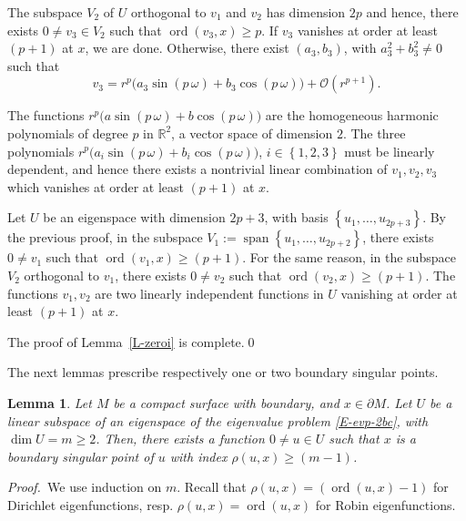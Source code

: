 \documentclass[12pt,a4paper]{amsart}
\theoremstyle{plain} %
\newtheorem{lemma}[theorem]{Lemma}
\theoremstyle{definition}
\numberwithin{equation}{section}
\numberwithin{figure}{section}
\numberwithin{table}{section}
\newcommand{\R}{\mathbb{R}}
\newcommand{\cO}{\mathcal{O}}
\DeclareMathOperator{\ord}{ord}
\DeclareMathOperator{\spanop}{span}
\newcommand{\pf}{\emph{Proof.~}}
\newcommand{\set}[1]{\left\lbrace #1 \right\rbrace}
\newcommand{\spanv}[1]{\spanop\!\left\lbrace #1 \right\rbrace}
\begin{document}
The subspace $V_2$ of $U$ orthogonal to $v_1$ and $v_2$ has dimension $2p$ and hence, there exists $0 \not = v_3 \in V_2$ such that $\ord(v_3,x) \ge p$. If $v_3$ vanishes at order at least $(p+1)$ at $x$, we are done. Otherwise, there exist $(a_3,b_3)$, with $a_3^2+b_3^2 \not = 0$ such that
%
\begin{equation*}
v_3 = r^{p} \big( a_3 \sin(p\, \omega) + b_3 \cos(p\, \omega) \big) +\cO(r^{p+1}).
\end{equation*}

The functions $r^p \big( a \sin(p\, \omega) + b \cos(p\, \omega) \big)$ are the homogeneous harmonic polynomials of degree $p$ in $\R^2$, a vector space of dimension $2$. The three polynomials $r^{p} \big( a_i \sin(p\, \omega) + b_i \cos(p\, \omega)\big)$, $i \in \set{1,2,3}$ must be linearly dependent, and hence there exists a nontrivial linear combination of $v_1,v_2,v_3$ which vanishes at order at least $(p+1)$ at $x$.\smallskip

Let $U$ be an eigenspace with dimension $2p+3$, with basis $\set{u_1,\ldots,u_{2p+3}}$. By the previous proof, in the subspace $V_1 := \spanv{u_1,\ldots,u_{2p+2}}$, there exists $0 \not = v_1$ such that $\ord(v_1,x) \ge (p+1)$. For the same reason, in the subspace $V_2$ orthogonal to $v_1$, there exists $0 \not = v_2$ such that $\ord(v_2,x) \ge (p+1)$. The functions $v_1, v_2$ are two linearly independent functions in $U$ vanishing at order at least $(p+1)$ at $x$. \smallskip

The proof of Lemma~\ref{L-zeroi} is complete.\hfill \qed \medskip

The next lemmas prescribe respectively one or two boundary singular points.

\begin{lemma}\label{L-zero1} Let $M$ be a compact surface with
boundary, and $x \in \partial M$. Let $U$ be a linear subspace of an eigenspace of the eigenvalue problem \eqref{E-evp-2bc}, with $\dim U = m \ge 2$. Then, there
exists a function $0 \not = u\in U$ such that $x$ is a boundary singular point of $u$ with index $\rho(u,x) \ge (m-1)$.
\end{lemma}

\pf We use induction on $m$.  Recall that $\rho(u,x) = (\ord(u,x) - 1)$ for Dirichlet eigenfunctions, resp. $\rho(u,x) = \ord(u,x)$ for Robin eigenfunctions. \smallskip
\end{document}

